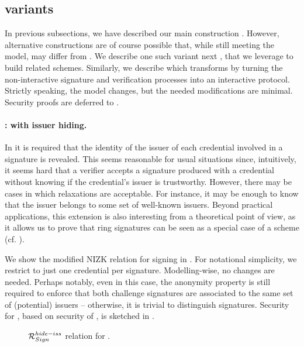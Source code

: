 
\subsection{\CUASGen variants}
\label{ssec:variants}

In previous subsections, we have described our main construction \CUASGen. 
However, alternative constructions are of course possible that, while
still meeting the \UAS model, may differ from \CUASGen. We describe one such
variant next \CUASGenHideIss, that we leverage to build related schemes.
%
Similarly, we describe \CUASGenInt which transforms \CUASGen by turning the
non-interactive signature and verification processes into an interactive
protocol. Strictly speaking, the model changes, but the needed modifications
are minimal.
%
Security proofs are deferred to .

\paragraph{\CUASGenHideIss: \RelSig with issuer hiding.} %
In \CUASGen it is required that the identity of the
issuer of each credential involved in a signature is revealed. This seems
reasonable for usual situations since, intuitively, it seems hard that a
verifier accepts a signature produced with a credential without knowing if the
credential's issuer is trustworthy. However, there may be cases in which
relaxations are acceptable. For instance, it may be enough to know that the
issuer belongs to some set of well-known issuers. Beyond practical applications,
this extension is also interesting from a theoretical point of view, as it
allows us to prove that ring signatures can be seen as a special case of a \UAS
scheme (cf. ). 

We show the modified NIZK relation for signing in . For
notational simplicity, we restrict to just one credential per signature.
%
Modelling-wise, no changes are needed. Perhaps notably, even in this case, the
anonymity property is still required to enforce that both challenge signatures
are associated to the same set of (potential) issuers -- otherwise, it is
trivial to distinguish signatures. Security for \CUASGenHideIss, based on
security of \CUASGen, is sketched in .

\begin{figure}[ht!]
  \scalebox{0.85}{
    
  }
  \caption{$\mathcal{R}^{hide-iss}_{Sign}$ relation for \CUASGenHideIss.}
  \label{fig:nizk-ring}
\end{figure}

